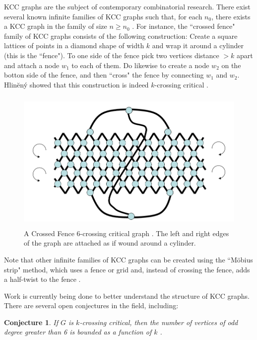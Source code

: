 \documentclass[11pt]{report}
\newtheorem{conj}{Conjecture}
\begin{document}
KCC graphs are the subject of contemporary combinatorial research. There exist several known infinite families of KCC graphs such that, for each $n_0$, there exists a KCC graph in the family of size $n\geq n_0$ \cite{Hlineny08}. For instance, the ``crossed fence" family of KCC graphs consists of the following construction: Create a square lattices of points in a diamond shape of width $k$ and wrap it around a cylinder (this is the ``fence"). To one side of the fence pick two vertices distance $> k$ apart and attach a node $w_1$ to each of them. Do likewise to create a node $w_2$ on the botton side of the fence, and then ``cross" the fence by connecting $w_1$ and $w_2$.  Hlin\u{e}n\'{y} showed that this construction is indeed $k$-crossing critical \cite{Hlineny08}. 


\begin{figure}[b!]
\begin{center}
\leavevmode
\includegraphics[height=69mm]{Crossed_Fence_v2.png}
\end{center}
\caption{A Crossed Fence 6-crossing critical graph \cite{Hlineny02}. The left and right edges of the graph are attached as if wound around a cylinder.}
\label{fig:four}
\end{figure}

 Note that other infinite families of KCC graphs can be created using the ``M\"{o}bius strip" method, which uses a fence or grid and, instead of crossing the fence, adds a half-twist to the fence \cite{Hlineny08}. 


Work is currently being done to better understand the structure of KCC graphs. There are several open conjectures in the field, including:

\begin{conj} If $G$ is $k$-crossing critical, then the number of vertices of odd degree greater than 6 is bounded as a function of $k$ \cite{Hlineny08}.
\end{conj}
\end{document}
